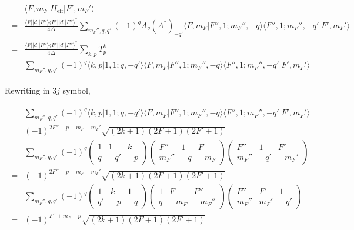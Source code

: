 \documentclass[10pt,fleqn]{article}
\newcommand{\eqar}[1]
{
  \begin{align}
    #1
  \end{align}
}
\newcommand{\paren}[1]{{\left({#1}\right)}}
\begin{document}
\eqar{
  \begin{split}
    &\langle F,m_F|H_{\mathrm{eff}}|F',m_F'\rangle\\
    =&\frac{\langle F||d||F''\rangle\langle F'||d||F''\rangle^*}{4\Delta}\!\!\sum_{m_F'',q,q'}\!\!(-1)^qA_{q}(A^*)_{-q'}\langle F,m_F|F'',1;m_F'',-q\rangle\langle F'',1;m_F'',-q'|F',m_F'\rangle\\
    =&\frac{\langle F||d||F''\rangle\langle F'||d||F''\rangle^*}{4\Delta}
       \!\sum_{k,p}T_p^k\\
    &\sum_{m_F'',q,q'}\!\!(-1)^q\langle k,p|1,1;q,-q'\rangle
      \langle F,m_F|F'',1;m_F'',-q\rangle\langle F'',1;m_F'',-q'|F',m_F'\rangle
  \end{split}
}
Rewriting in $3j$ symbol,
\eqar{
  \begin{split}
    &\sum_{m_F'',q,q'}\!\!(-1)^q\langle k,p|1,1;q,-q'\rangle
      \langle F,m_F|F'',1;m_F'',-q\rangle\langle F'',1;m_F'',-q'|F',m_F'\rangle\\
    =&(-1)^{2F''+p-m_F-m_F'}\sqrt{\paren{2k+1}\paren{2F+1}\paren{2F'+1}}\\
    &\sum_{m_F'',q,q'}\!\!(-1)^q\begin{pmatrix}
      1&1&k\\
      q&-q'&-p
    \end{pmatrix}\begin{pmatrix}
      F''&1&F\\
      m_F''&-q&-m_F
    \end{pmatrix}\begin{pmatrix}
      F''&1&F'\\
      m_F''&-q'&-m_F'
    \end{pmatrix}\\
    =&(-1)^{2F''+p-m_F-m_F'}\sqrt{\paren{2k+1}\paren{2F+1}\paren{2F'+1}}\\
    &\sum_{m_F'',q,q'}\!\!(-1)^q\begin{pmatrix}
      1&k&1\\
      q'&-p&-q
    \end{pmatrix}\begin{pmatrix}
      1&F&F''\\
      q&-m_F&-m_F''
    \end{pmatrix}\begin{pmatrix}
      F''&F'&1\\
      m_F''&m_F'&-q'
    \end{pmatrix}\\
    =&(-1)^{F''+m_F-p}\sqrt{\paren{2k+1}\paren{2F+1}\paren{2F'+1}}\\

\end{split}}
\end{document}
